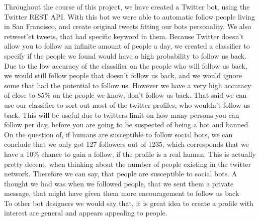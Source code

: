 Throughout the course of this project, we have created a Twitter bot, using the Twitter REST API. With this bot we were able to automatic follow people living in San Francisco, and create original tweets fitting our bots personality. We also retweet'et tweets, that had specific keyword in them. Because Twitter doesn't allow you to follow an infinite amount of people a day, we created a classifier to specify if the people we found would have a high probability to follow us back. Due to the low accuracy of the classifier on the people who will follow us back, we would still follow people that doesn't follow us back, and we would ignore some that had the potential to follow us. However we have a very high accuracy of close to 85\% on the people we know, don't follow us back. That said we can use our classifier to sort out most of the twitter profiles, who wouldn't follow us back. This will be useful due to twitters limit on how many persons you can follow per day, before you are going to be suspected of being a bot and banned.\\
On the question of, if humans are susceptible to follow social bots, we can conclude that we only got 127 followers out of 1235, which corresponds that we have a 10\% chance to gain a follow, if the profile is a real human. This is actually pretty decent, when thinking about the number of people existing in the twitter network. Therefore we can say, that people are susceptible to social bots.
A thought we had was when we followed people, that we sent them a private message, that might have given them more encouragement to follow us back\\
To other bot designers we would say that, it is great idea to create a profile with interest are general and appears appealing to people.
